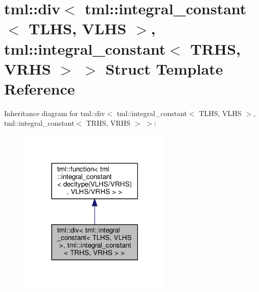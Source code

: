\hypertarget{structtml_1_1div_3_01tml_1_1integral__constant_3_01_t_l_h_s_00_01_v_l_h_s_01_4_00_01tml_1_1integ1ee739564988b18df857b7c3e3a365e0}{\section{tml\+:\+:div$<$ tml\+:\+:integral\+\_\+constant$<$ T\+L\+H\+S, V\+L\+H\+S $>$, tml\+:\+:integral\+\_\+constant$<$ T\+R\+H\+S, V\+R\+H\+S $>$ $>$ Struct Template Reference}
\label{structtml_1_1div_3_01tml_1_1integral__constant_3_01_t_l_h_s_00_01_v_l_h_s_01_4_00_01tml_1_1integ1ee739564988b18df857b7c3e3a365e0}
}


Inheritance diagram for tml\+:\+:div$<$ tml\+:\+:integral\+\_\+constant$<$ T\+L\+H\+S, V\+L\+H\+S $>$, tml\+:\+:integral\+\_\+constant$<$ T\+R\+H\+S, V\+R\+H\+S $>$ $>$\+:
\nopagebreak
\begin{figure}[H]
\begin{center}
\leavevmode
\includegraphics[width=206pt]{structtml_1_1div_3_01tml_1_1integral__constant_3_01_t_l_h_s_00_01_v_l_h_s_01_4_00_01tml_1_1integ528b63fe71d09b26a19a4c6148cd826e}
\end{center}
\end{figure}


